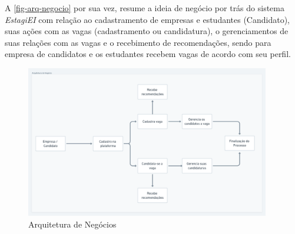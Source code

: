 A \autoref{fig-arq-negocio} por sua vez, resume a ideia de negócio por trás do sistema \emph{EstagiEI} com relação ao cadastramento de empresas e estudantes (Candidato), suas ações com as vagas (cadastramento ou candidatura), o gerenciamentos de suas relações com as vagas e o recebimento de recomendações, sendo para empresa de candidatos e os estudantes recebem vagas de acordo com seu perfil.

\begin{figure}[H]
	\centering
	\caption{\label{fig-arq-negocio}Arquitetura de Negócios}
	\includegraphics[width=0.95\textwidth]{../imagens/arq-proj-arq-negocio2.png}
\end{figure}